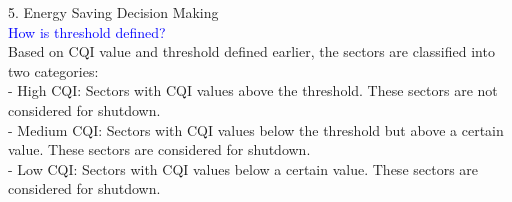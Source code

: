 5. Energy Saving Decision Making \\
\textcolor{blue}{How is threshold defined?} \\
Based on CQI value and threshold defined earlier, the sectors are classified into two categories: \\
- High CQI: Sectors with CQI values above the threshold. These sectors are not considered for shutdown. \\
- Medium CQI: Sectors with CQI values below the threshold but above a certain value. These sectors are considered for shutdown. \\
- Low CQI: Sectors with CQI values below a certain value. These sectors are considered for shutdown. \\

